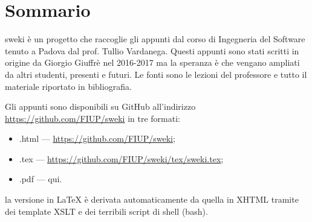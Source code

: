\section{Sommario}
sweki è un progetto che raccoglie gli appunti dal corso di Ingegneria del Software tenuto a Padova dal prof. Tullio Vardanega. Questi appunti sono stati scritti in origine da Giorgio Giuffrè nel 2016-2017 ma la speranza è che vengano ampliati da altri studenti, presenti e futuri. Le fonti sono le lezioni del professore e tutto il materiale riportato in bibliografia.

Gli appunti sono disponibili su GitHub all'indirizzo \url{https://github.com/FIUP/sweki} in tre formati:
\begin{itemize}
	\item .html --- \url{https://github.com/FIUP/sweki};
	\item .tex --- \url{https://github.com/FIUP/sweki/tex/sweki.tex};
	\item .pdf --- qui.
\end{itemize}

la versione in \LaTeX{} è derivata automaticamente da quella in XHTML tramite dei template XSLT e dei terribili script di shell (bash).
